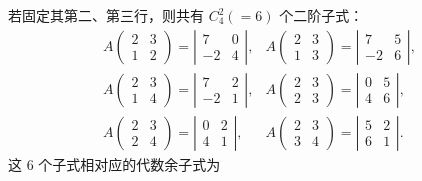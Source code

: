 \documentclass[UTF8, 12pt, fontset=fandol, oneside]{ctexart}
\begin{document}
若固定其第二、第三行，则共有 $C_4^2(=6)$ 个二阶子式：
\[
\begin{array}{lll}
A\left(\begin{array}{cc}2&3\\1&2\end{array}\right)=
\left|\begin{array}{cc}7&0\\-2&4\end{array}\right|,
&
A\left(\begin{array}{cc}2&3\\1&3\end{array}\right)=
\left|\begin{array}{cc}7&5\\-2&6\end{array}\right|,
\\[1.2em]
A\left(\begin{array}{cc}2&3\\1&4\end{array}\right)=
\left|\begin{array}{cc}7&2\\-2&1\end{array}\right|,
&
A\left(\begin{array}{cc}2&3\\2&3\end{array}\right)=
\left|\begin{array}{cc}0&5\\4&6\end{array}\right|,
\\[1.2em]
A\left(\begin{array}{cc}2&3\\2&4\end{array}\right)=
\left|\begin{array}{cc}0&2\\4&1\end{array}\right|,
&
A\left(\begin{array}{cc}2&3\\3&4\end{array}\right)=
\left|\begin{array}{cc}5&2\\6&1\end{array}\right|.
\end{array}
\]
这 6 个子式相对应的代数余子式为
\end{document}
